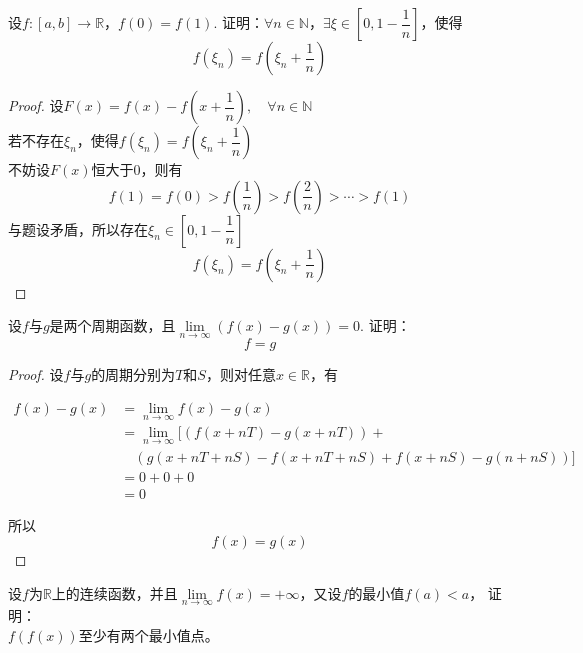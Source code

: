 \begin{proposition}

    设$f:[a,b]\to \mathbb{R}$，$f(0)=f(1)$.
    证明：$\forall n\in \mathbb{N}$，$\exists \xi \in \left[0,1-\dfrac{1}{n}\right]$，使得
    $$f(\xi_n) = f\left(\xi_n+\dfrac{1}{n}\right)$$

\end{proposition}

\begin{proof}
    
    设$F(x) = f(x) - f\left(x + \dfrac{1}{n}\right),\quad \forall n \in \mathbb{N}$\\
    若不存在$\xi_n$，使得$f(\xi_n) = f\left(\xi_n+\dfrac{1}{n}\right)$\\
    不妨设$F(x)$恒大于$0$，则有
    $$f(1) = f(0) > f\left(\dfrac{1}{n}\right) > f\left(\dfrac{2}{n}\right) > \cdots > f(1)$$
    与题设矛盾，所以存在$\xi_n \in \left[0,1-\dfrac{1}{n}\right]$
    $$f(\xi_n) = f\left(\xi_n + \dfrac{1}{n}\right)$$

\end{proof}

\begin{proposition}
    
    设$f$与$g$是两个周期函数，且$\lim\limits_{n\to\infty}{(f(x)-g(x))}=0$.
    证明：
    $$f = g $$

\end{proposition}

\begin{proof}
    
    设$f$与$g$的周期分别为$T$和$S$，则对任意$x \in \mathbb{R}$，有
    
    \begin{align*}
        f(x)-g(x) &= \lim_{n\to\infty}{f(x)-g(x)}\\
        &= \lim_{n\to\infty}[(f(x+nT)-g(x+nT))+\\
        &\quad(g(x+nT+nS)-f(x+nT+nS)+f(x+nS)-g(n+nS))]\\
        &= 0 + 0 + 0\\
        &= 0
    \end{align*}

    所以
    $$f(x)=g(x)$$

\end{proof}

\begin{proposition}
    
    设$f$为$\mathbb{R}$上的连续函数，并且$\lim\limits_{n\to\infty}{f(x)}=+\infty$，又设$f$的最小值$f(a)<a$，
    证明：\\
    $f(f(x))$至少有两个最小值点。
\end{proposition}


